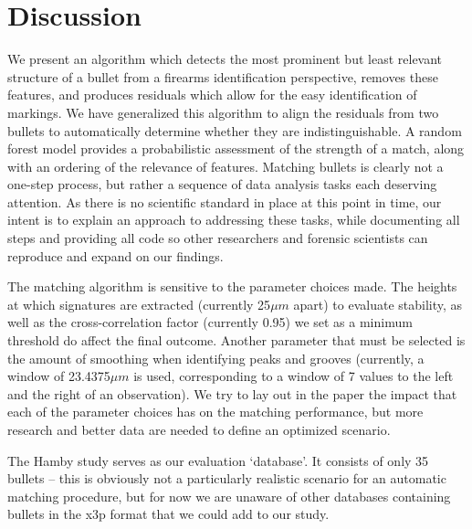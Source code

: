 \documentclass[aoas, preprint]{imsart}\usepackage[]{graphicx}\usepackage[]{color}
\begin{document}
\section{Discussion}

We present an algorithm which detects the most prominent but least relevant structure of a bullet from a firearms identification perspective, removes these features, and produces residuals which allow for the easy identification of markings. We have generalized this algorithm to align the residuals from two bullets to automatically determine whether they are indistinguishable. A random forest model provides a probabilistic assessment of the strength of a match, along with an ordering of the relevance of features. Matching bullets is clearly not a one-step process, but rather a sequence of data analysis tasks each deserving attention. As there is no scientific standard in place at this point in time, our intent is to explain an approach to addressing these tasks, while documenting all steps and providing all code so other researchers and forensic scientists can reproduce and expand on our findings.

The matching algorithm is sensitive to the parameter choices made. The heights at which signatures are extracted (currently 25$\mu m$ apart) to evaluate stability, as well as the cross-correlation factor (currently 0.95) we set as a minimum threshold do affect the final outcome. Another parameter that must be selected is the amount of smoothing when identifying peaks and grooves (currently, a window of 23.4375$\mu m$ is used, corresponding to a window of 7 values to the left and the right of an observation). We try to lay out in the paper the impact that each of the parameter choices has on the matching performance, but more research and better data are needed to define an optimized scenario.

The Hamby study serves as our evaluation `database'. It consists of only  35 bullets -- this is obviously not a particularly realistic scenario for an automatic matching procedure, but for now we are unaware of other databases containing bullets in the x3p format that we could add to our study.
 
\end{document}
